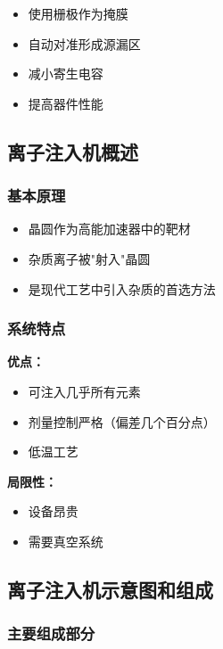 \documentclass[UTF8,12pt,a4paper]{ctexart}
\begin{document}
\begin{itemize}
    \item 使用栅极作为掩膜
    \item 自动对准形成源漏区
    \item 减小寄生电容
    \item 提高器件性能
\end{itemize}

\subsection{离子注入机概述}

\subsubsection{基本原理}

\begin{itemize}
    \item 晶圆作为高能加速器中的靶材
    \item 杂质离子被"射入"晶圆
    \item 是现代工艺中引入杂质的首选方法
\end{itemize}

\subsubsection{系统特点}

\textbf{优点：}
\begin{itemize}
    \item 可注入几乎所有元素
    \item 剂量控制严格（偏差几个百分点）
    \item 低温工艺
\end{itemize}

\textbf{局限性：}
\begin{itemize}
    \item 设备昂贵
    \item 需要真空系统
\end{itemize}

\subsection{离子注入机示意图和组成}

\subsubsection{主要组成部分}
\end{document}
